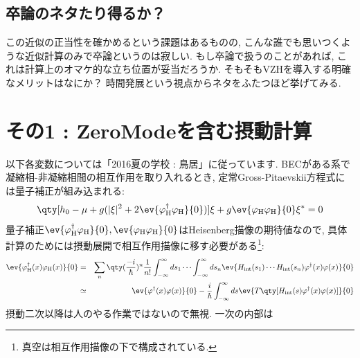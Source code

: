 \documentclass[10.5pt,a4paper]{jreport}
\begin{document}
\subsection{卒論のネタたり得るか？}
この近似の正当性を確かめるという課題はあるものの, こんな誰でも思いつくような近似計算のみで卒論というのは寂しい. もし卒論で扱うのことがあれば, これは計算上のオマケ的な立ち位置が妥当だろうか. そもそもVZHを導入する明確なメリットはなにか？ 時間発展という視点からネタをふたつほど挙げてみる.
\section{その1 : ZeroModeを含む摂動計算}
以下各変数については「2016夏の学校 : 鳥居」に従っています. BECがある系で凝縮相-非凝縮相間の相互作用を取り入れるとき, 定常Gross-Pitaevskii方程式には量子補正が組み込まれる:
\begin{eqnarray}
  \qty[h_0 - \mu +  g(|\xi|^2 + 2\ev{\varphi_{\rm H}^\dagger\varphi_{\rm H}}{0})]\xi + g\ev{\varphi_{\rm H}\varphi_{\rm H}}{0}\xi^* = 0
\end{eqnarray}
量子補正$\ev{\varphi_{\rm H}^\dagger\varphi_{\rm H}}{0}, \ev{\varphi_{\rm H}\varphi_{\rm H}}{0}$はHeisenberg描像の期待値なので, 具体計算のためには摂動展開で相互作用描像に移す必要がある\footnote{真空は相互作用描像の下で構成されている. }:
\begin{eqnarray}
  \ev{\varphi_{\rm H}^\dagger(x)\varphi_{\rm H}(x)}{0} &=& \sum_n\qty(\frac{-i}{\hbar})^n\frac{1}{n!}\int_{-\infty}^\infty ds_1 \cdots\int_{-\infty}^\infty ds_n \ev{H_{\rm int}(s_1)\cdots H_{\rm int}(s_n)\varphi^\dagger(x)\varphi(x)}{0}\\
  &\simeq& \ev{\varphi^\dagger(x)\varphi(x)}{0} - \frac{i}{\hbar}\int_{-\infty}^{\infty}ds\ev{T\qty[H_{\rm int}(s)\varphi^\dagger(x)\varphi(x)]}{0}
\end{eqnarray}
摂動二次以降は人のやる作業ではないので無視. 一次の内部は
\end{document}
